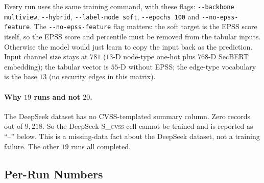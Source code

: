 \documentclass[11pt]{article}
\begin{document}
Every run uses the same training command, with these flags:
\texttt{-{}-backbone multiview}, \texttt{-{}-hybrid},
\texttt{-{}-label-mode soft}, \texttt{-{}-epochs 100} and
\texttt{-{}-no-epss-feature}.
The \texttt{-{}-no-epss-feature} flag matters: the soft target is the EPSS
score itself, so the EPSS score and percentile must be removed from the
tabular inputs. Otherwise the model would just learn to copy the input
back as the prediction. Input channel size stays at $781$ ($13$-D
node-type one-hot plus $768$-D SecBERT embedding); the tabular vector
is $55$-D without EPSS; the edge-type vocabulary is the base $13$ (no
security edges in this matrix).

\paragraph{Why $19$ runs and not $20$.}
The DeepSeek dataset has no CVSS-templated summary column. Zero records
out of $9{,}218$. So the DeepSeek \textsc{S\_cvss} cell cannot be trained
and is reported as ``--'' below. This is a missing-data fact about the
DeepSeek dataset, not a training failure. The other $19$ runs all
completed.

\subsection{Per-Run Numbers}
\end{document}
